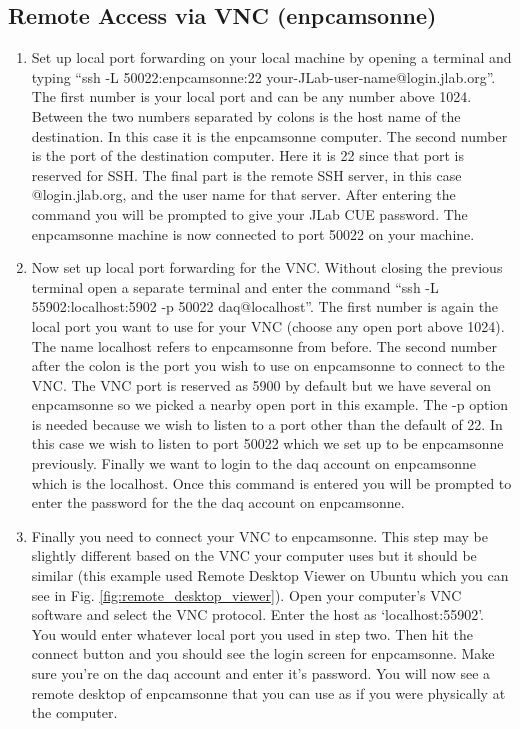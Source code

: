 \documentclass[oneside]{book}   %
\begin{document}
\subsection{Remote Access via VNC (enpcamsonne)}
\label{sec:remote_vnc}
\begin{enumerate}
	\item Set up local port forwarding on your local machine by opening a terminal and typing ``ssh -L 50022:enpcamsonne:22 your-JLab-user-name@login.jlab.org''. The first number is your local port and can be any number above 1024. Between the two numbers separated by colons is the host name of the destination. In this case it is the enpcamsonne computer. The second number is the port of the destination computer. Here it is 22 since that port is reserved for SSH. The final part is the remote SSH server, in this case @login.jlab.org, and the user name for that server. After entering the command you will be prompted to give your JLab CUE password. The enpcamsonne machine is now connected to port 50022 on your machine.
	\item Now set up local port forwarding for the VNC. Without closing the previous terminal open a separate terminal and enter the command ``ssh -L 55902:localhost:5902 -p 50022 daq@localhost''. The first number is again the local port you want to use for your VNC (choose any open port above 1024). The name localhost refers to enpcamsonne from before. The second number after the colon is the port you wish to use on enpcamsonne to connect to the VNC. The VNC port is reserved as 5900 by default but we have several on enpcamsonne so we picked a nearby open port in this example. The -p option is needed because we wish to listen to a port other than the default of 22. In this case we wish to listen to port 50022 which we set up to be enpcamsonne previously. Finally we want to login to the daq account on enpcamsonne which is the localhost. Once this command is entered you will be prompted to enter the password for the the daq account on enpcamsonne. 
	\item Finally you need to connect your VNC to enpcamsonne. This step may be slightly different based on the VNC your computer uses but it should be similar (this example used Remote Desktop Viewer on Ubuntu which you can see in Fig. \ref{fig:remote_desktop_viewer}). Open your computer's VNC software and select the VNC protocol. Enter the host as `localhost:55902'. You would enter whatever local port you used in step two. Then hit the connect button and you should see the login screen for enpcamsonne. Make sure you're on the daq account and enter it's password. You will now see a remote desktop of enpcamsonne that you can use as if you were physically at the computer.
\end{enumerate}
\end{document}
